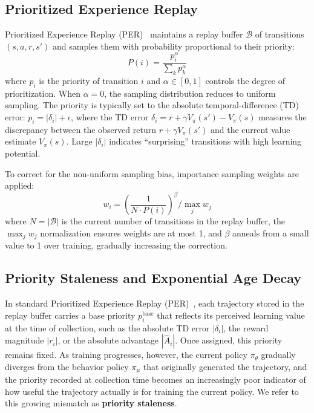 \documentclass[runningheads]{llncs}
\begin{document}
\subsection{Prioritized Experience Replay}

Prioritized Experience Replay (PER)~\cite{schaul2016per} maintains a replay buffer $\mathcal{B}$ of transitions $(s, a, r, s')$ and samples them with probability proportional to their priority:
\begin{equation}
    P(i) = \frac{p_i^\alpha}{\sum_k p_k^\alpha}
    \label{eq:per_sampling}
\end{equation}
where $p_i$ is the priority of transition $i$ and $\alpha \in [0, 1]$ controls the degree of prioritization. When $\alpha = 0$, the sampling distribution reduces to uniform sampling. The priority is typically set to the absolute temporal-difference (TD) error: $p_i = |\delta_i| + \epsilon$, where the TD error $\delta_i = r + \gamma V_{\pi}(s') - V_{\pi}(s)$ measures the discrepancy between the observed return $r + \gamma V_{\pi}(s')$ and the current value estimate $V_{\pi}(s)$. Large $|\delta_i|$ indicates ``surprising'' transitions with high learning potential.

To correct for the non-uniform sampling bias, importance sampling weights are applied:
\begin{equation}
    w_i = \left( \frac{1}{N \cdot P(i)} \right)^\beta \bigg/ \max_j w_j
    \label{eq:is_weights}
\end{equation}
where $N = |\mathcal{B}|$ is the current number of transitions in the replay buffer, the $\max_j w_j$ normalization ensures weights are at most 1, and $\beta$ anneals from a small value to 1 over training, gradually increasing the correction.

\subsection{Priority Staleness and Exponential Age Decay}
\label{sec:staleness}
In standard Prioritized Experience Replay (PER)~\cite{schaul2016per}, each trajectory stored in the replay buffer carries a base priority $p_i^{\text{base}}$ that reflects its perceived learning value at the time of collection, such as the absolute TD error $|\delta_i|$, the reward magnitude $|r_i|$, or the absolute advantage $|\hat{A}_i|$.
Once assigned, this priority remains fixed.
As training progresses, however, the current policy $\pi_\theta$ gradually diverges from the behavior policy $\pi_\mu$ that originally generated the trajectory, and the priority recorded at collection time becomes an increasingly poor indicator of how useful the trajectory actually is for training the current policy.
We refer to this growing mismatch as \textbf{priority staleness}.
\end{document}
